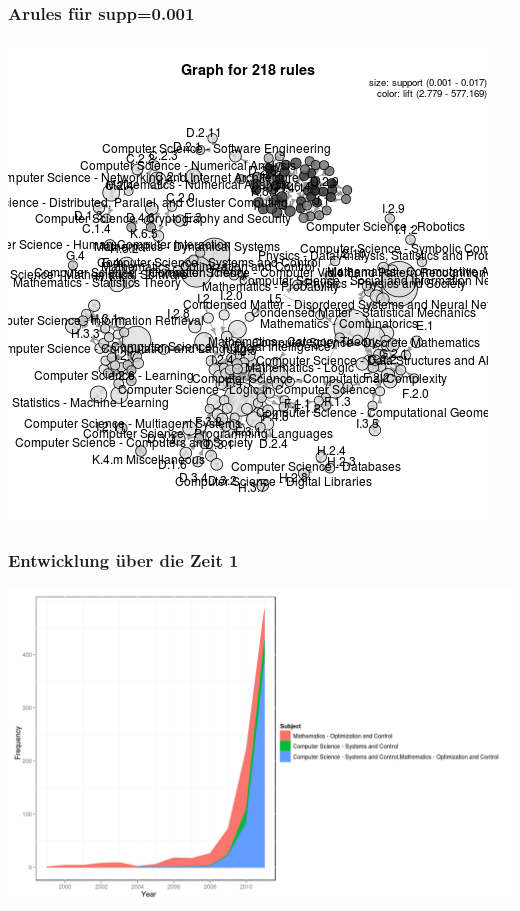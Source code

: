 \documentclass[12pt, xcolor=table]{beamer}
\begin{document}
\begin{frame}
    \frametitle{Arules für supp=0.001}
    \begin{center}
		\includegraphics[scale=0.5]{../../visual/graph_218rules.png}
	\end{center}
\end{frame}
\begin{frame}
	\frametitle{Entwicklung über die Zeit 1}
	\begin{center}
		\includegraphics[scale=0.4]{../../visual/trend/csmath.png}
	\end{center}
\end{frame}
\end{document}
